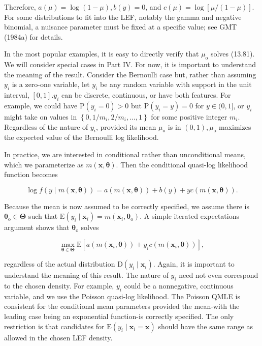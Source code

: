 \documentclass[10pt]{article}
\begin{document}
Therefore, $a(\mu)=\log (1-\mu), b(y)=0$, and $c(\mu)=\log [\mu /(1-\mu)]$. For some distributions to fit into the LEF, notably the gamma and negative binomial, a nuisance parameter must be fixed at a specific value; see GMT (1984a) for details.

In the most popular examples, it is easy to directly verify that $\mu_{\mathrm{o}}$ solves (13.81). We will consider special cases in Part IV. For now, it is important to understand the meaning of the result. Consider the Bernoulli case but, rather than assuming $y_{i}$ is a zero-one variable, let $y_{i}$ be any random variable with support in the unit interval, $[0,1] . y_{i}$ can be discrete, continuous, or have both features. For example, we could have $\mathrm{P}\left(y_{i}=0\right)>0$ but $\mathrm{P}\left(y_{i}=y\right)=0$ for $y \in(0,1]$, or $y_{i}$ might take on values in $\left\{0,1 / m_{i}, 2 / m_{i}, \ldots, 1\right\}$ for some positive integer $m_{i}$. Regardless of the nature of $y_{i}$, provided its mean $\mu_{\mathrm{o}}$ is in $(0,1), \mu_{\mathrm{o}}$ maximizes the expected value of the Bernoulli log likelihood.

In practice, we are interested in conditional rather than unconditional means, which we parameterize as $m(\mathbf{x}, \boldsymbol{\theta})$. Then the conditional quasi-log likelihood function becomes


\begin{equation*}
\log f(y \mid m(\mathbf{x}, \boldsymbol{\theta}))=a(m(\mathbf{x}, \boldsymbol{\theta}))+b(y)+y c(m(\mathbf{x}, \boldsymbol{\theta})) . \tag{13.82}
\end{equation*}


Because the mean is now assumed to be correctly specified, we assume there is $\boldsymbol{\theta}_{\mathrm{o}} \in \boldsymbol{\Theta}$ such that $\mathrm{E}\left(y_{i} \mid \mathbf{x}_{i}\right)=m\left(\mathbf{x}_{i}, \boldsymbol{\theta}_{\mathrm{o}}\right)$. A simple iterated expectations argument shows that $\boldsymbol{\theta}_{\mathrm{o}}$ solves


\begin{equation*}
\max _{\boldsymbol{\theta} \in \boldsymbol{\Theta}} \mathrm{E}\left[a\left(m\left(\mathbf{x}_{i}, \boldsymbol{\theta}\right)\right)+y_{i} c\left(m\left(\mathbf{x}_{i}, \boldsymbol{\theta}\right)\right)\right], \tag{13.83}
\end{equation*}


regardless of the actual distribution $\mathrm{D}\left(y_{i} \mid \mathbf{x}_{i}\right)$. Again, it is important to understand the meaning of this result. The nature of $y_{i}$ need not even correspond to the chosen density. For example, $y_{i}$ could be a nonnegative, continuous variable, and we use the Poisson quasi-log likelihood. The Poisson QMLE is consistent for the conditional mean parameters provided the mean-with the leading case being an exponential function-is correctly specified. The only restriction is that candidates for $\mathrm{E}\left(y_{i} \mid \mathbf{x}_{i}=\mathbf{x}\right)$ should have the same range as allowed in the chosen LEF density.
\end{document}
